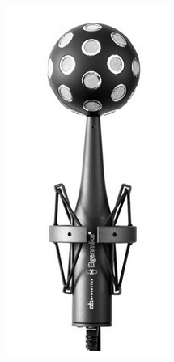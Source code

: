 \begin{figure}[t]
\centering
    \begin{subfigure}[b]{0.3\textwidth}
        \includegraphics[width=\textwidth]{01_introduction/images/eigenmike_bw.png}

\end{subfigure}
\end{figure}
